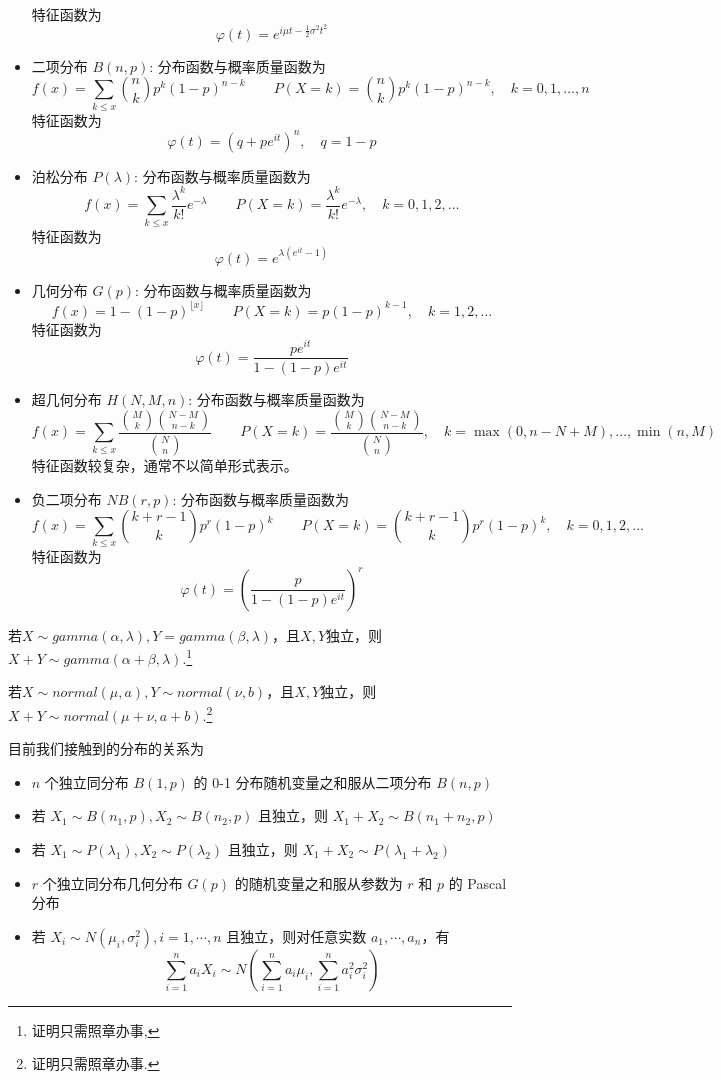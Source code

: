 \begin{itemize}
\begin{gather*}
          \end{gather*}
          特征函数为
          $$\varphi(t) = e^{i\mu t - \frac{1}{2}\sigma^2 t^2}$$
    \item 二项分布 $B(n,p)$: 分布函数与概率质量函数为
          $$f(x)=\sum_{k\leq x}\binom{n}{k}p^k(1-p)^{n-k} \qquad P(X=k)=\binom{n}{k}p^k(1-p)^{n-k}, \quad k=0,1,\ldots,n$$
          特征函数为
          $$\varphi(t) = \left(q + pe^{it}\right)^n, \quad q = 1-p$$
    \item 泊松分布 $P(\lambda)$: 分布函数与概率质量函数为
          $$f(x)=\sum_{k\leq x}\frac{\lambda^k}{k!}e^{-\lambda} \qquad P(X=k)=\frac{\lambda^k}{k!}e^{-\lambda}, \quad k=0,1,2,\ldots$$
          特征函数为
          $$\varphi(t) = e^{\lambda(e^{it} - 1)}$$
    \item 几何分布 $G(p)$: 分布函数与概率质量函数为
          $$f(x)=1-(1-p)^{\lfloor x \rfloor} \qquad P(X=k)=p(1-p)^{k-1}, \quad k=1,2,\ldots$$
          特征函数为
          $$\varphi(t) = \frac{pe^{it}}{1 - (1-p)e^{it}}$$
    \item 超几何分布 $H(N,M,n)$: 分布函数与概率质量函数为
          $$f(x)=\sum_{k\leq x}\frac{\binom{M}{k}\binom{N-M}{n-k}}{\binom{N}{n}} \qquad P(X=k)=\frac{\binom{M}{k}\binom{N-M}{n-k}}{\binom{N}{n}}, \quad k=\max(0,n-N+M),\ldots,\min(n,M)$$
          特征函数较复杂，通常不以简单形式表示。
    \item 负二项分布 $NB(r,p)$: 分布函数与概率质量函数为
          $$f(x)=\sum_{k\leq x}\binom{k+r-1}{k}p^r(1-p)^k \qquad P(X=k)=\binom{k+r-1}{k}p^r(1-p)^k, \quad k=0,1,2,\ldots$$
          特征函数为
          $$\varphi(t) = \left(\frac{p}{1 - (1-p)e^{it}}\right)^r$$
\end{itemize}

\begin{theorem}
    若$X\sim gamma(\alpha,\lambda),Y=gamma(\beta,\lambda)$，且$X,Y$独立，则$X+Y\sim gamma(\alpha+\beta,\lambda)$.\footnote{证明只需照章办事,}
\end{theorem}

\begin{theorem}[正态分布的性质]
    若$X\sim normal(\mu ,a ),Y\sim normal(\nu,b)$，且$X,Y$独立，则$X+Y\sim normal(\mu+\nu,a+b)$.\footnote{证明只需照章办事.}
\end{theorem}

目前我们接触到的分布的关系为
\begin{itemize}
    \item $n$ 个独立同分布 $B(1, p)$ 的 0-1 分布随机变量之和服从二项分布 $B(n, p)$
    \item 若 $X_1\sim B(n_1,p),X_2\sim B(n_2,p)$ 且独立，则 $X_1+X_2\sim B(n_1+n_2,p)$
    \item 若 $X_1\sim P(\lambda_1),X_2\sim P(\lambda_2)$ 且独立，则 $X_1+X_2\sim P(\lambda_1+\lambda_2)$
    \item $r$ 个独立同分布几何分布 $G(p)$ 的随机变量之和服从参数为 $r$ 和 $p$ 的 Pascal 分布
    \item 若 $X_i\sim N(\mu_i,\sigma_i^2),i=1,\cdots,n$ 且独立，则对任意实数 $a_1,\cdots,a_n$，有
          $$\sum_{i=1}^n a_iX_i\sim N\left(\sum_{i=1}^n a_i\mu_i,\sum_{i=1}^n a_i^2\sigma_i^2\right)$$
\end{itemize}


